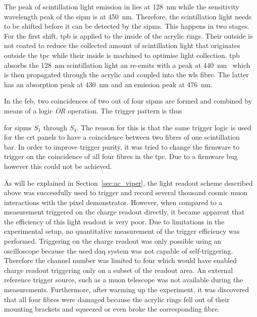 The peak of scintillation light emission in \lar{} lies at \SI{128}{\nano\metre} while the sensitivity wavelength peak of the \gls{sipm} is at \SI{450}{\nano\metre}.
Therefore, the scintillation light needs to be shifted before it can be detected by the \glspl{sipm}.
This happens in two stages.
For the first shift, \gls{tpb} is applied to the inside of the acrylic rings.
Their outside is not coated to reduce the collected amount of scintillation light that originates outside the \gls{tpc} while their inside is machined to optimise light collection.
\gls{tpb} absorbs the \SI{128}{\nano\metre} scintillation light an re-emits with a peak at \SI{440}{\nano\metre}~\cite{tpb} which is then propagated through the acrylic and coupled into the \gls{wls} fibre.
The latter has an absorption peak at \SI{430}{\nano\metre} and an emission peak at \SI{476}{\nano\metre}.

In the \gls{feb}, two coincidences of two out of four \glspl{sipm} are formed and combined by means of a logic \emph{OR} operation.
The trigger pattern is thus
for \glspl{sipm} $S_1$ through $S_4$.
The reason for this is that the same trigger logic is used for the \gls{crt} panels to have a coincidence between two fibres of one scintillation bar.
In order to improve trigger purity, it was tried to change the firmware to trigger on the coincidence of all four fibres in the \gls{tpc}.
Due to a firmware bug however this could not be achieved.

As will be explained in Section~\ref{sec:ac_viper}, the light readout scheme described above was successfully used to trigger and record several thousand cosmic muon interactions with the \AC{} pixel demonstrator.
However, when compared to a measurement triggered on the charge readout directly, it became apparent that the efficiency of this light readout is very poor.
Due to limitations in the experimental setup, no quantitative measurement of the trigger efficiency was performed.
Triggering on the charge readout was only possible using an oscilloscope because the used \gls{daq} system was not capable of self-triggering.
Therefore the channel number was limited to four which would have enabled charge readout triggering only on a subset of the readout area.
An external reference trigger source, such as a muon telescope was not available during the measurements.
Furthermore, after warming up the experiment, it was discovered that all four fibres were damaged because the acrylic rings fell out of their mounting brackets and squeezed or even broke the corresponding fibre.

